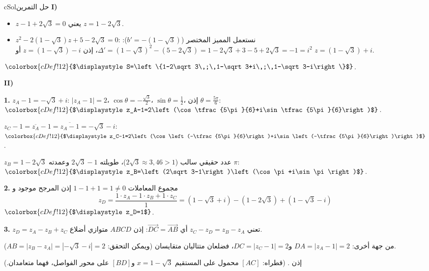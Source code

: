 \documentclass[12pt,a4paper]{article}
\newcounter{exo}
\newenvironment{hal}{\Needspace{12\baselineskip}\begin{otherlanguage}{english}\begin{arbox}[breakable]{cSol}{حل التمرين \theexo}}{\end{arbox}\end{otherlanguage}}
\newenvironment{LTR}{\begin{otherlanguage}{english}}{\end{otherlanguage}}
\newcommand{\ar}[1]{\foreignlanguage{arabic}{#1}}
\newcommand{\bx}[1]{\ensuremath{\colorbox{cDef!12}{$\displaystyle #1$}}}
\newcommand{\QQ}[1]{\par\smallskip\textbf{#1.} }
\newcommand{\bxt}[1]{\foreignlanguage{english}{\bxtbox{\ar{#1}}}}
\begin{document}
\begin{hal}
\textbf{I)}
\begin{itemize}
\item $z-1+2\sqrt3=0$ يعني $z=1-2\sqrt3$.
\item $z^2-2\left(1-\sqrt3\right)z+5-2\sqrt3=0$: نستعمل المميز المختصر ($b'=-(1-\sqrt3)$):
$\Delta'=\left(1-\sqrt3\right)^2-\left(5-2\sqrt3\right)=1-2\sqrt3+3-5+2\sqrt3=-1=i^2$،
إذن $z=\left(1-\sqrt3\right)-i$ أو $z=\left(1-\sqrt3\right)+i$.
\end{itemize}
\bx{S=\left\{1-2\sqrt3\,;\,1-\sqrt3+i\,;\,1-\sqrt3-i\right\}}.

\textbf{II)}
\QQ{1} $z_A-1=-\sqrt3+i$: $|z_A-1|=2$، $\cos\theta=-\frac{\sqrt3}{2}$، $\sin\theta=\frac12$، إذن $\theta=\frac{5\pi}{6}$:
\bx{z_A-1=2\left(\cos\tfrac{5\pi}{6}+i\sin\tfrac{5\pi}{6}\right)}.

$z_C-1=\overline{z_A}-1=\overline{z_A-1}=-\sqrt3-i$:
\bx{z_C-1=2\left(\cos\left(-\tfrac{5\pi}{6}\right)+i\sin\left(-\tfrac{5\pi}{6}\right)\right)}.

$z_B=1-2\sqrt3$ عدد حقيقي سالب ($2\sqrt3\approx3{,}46>1$)، طويلته $2\sqrt3-1$ وعمدته $\pi$:
\bx{z_B=\left(2\sqrt3-1\right)\left(\cos\pi+i\sin\pi\right)}.

\QQ{2} مجموع المعاملات $1-1+1=1\neq0$ إذن المرجح موجود و
\[z_D=\frac{1\cdot z_A-1\cdot z_B+1\cdot z_C}{1}=\left(1-\sqrt3+i\right)-\left(1-2\sqrt3\right)+\left(1-\sqrt3-i\right)\]
\bx{z_D=1}.

\QQ{3} $z_D=z_A-z_B+z_C$ تعني $z_C-z_D=z_B-z_A$ أي $\overrightarrow{DC}=\overrightarrow{AB}$: إذن $ABCD$ متوازي أضلاع.

من جهة أخرى: $DA=|z_A-1|=2$ و$DC=|z_C-1|=2$، فضلعان متتاليان متقايسان (ويمكن التحقق: $AB=|z_B-z_A|=|-\sqrt3-i|=2$).

إذن \bxt{$ABCD$ معين طول ضلعه $2$}. (قطراه: $[AC]$ محمول على المستقيم $x=1-\sqrt3$ و$[BD]$ على محور الفواصل، فهما متعامدان.)

\begin{center}\begin{LTR}\end{LTR}\end{center}
\end{hal}
\end{document}

